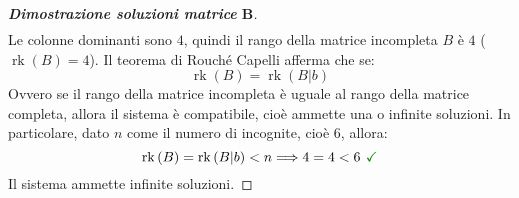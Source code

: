 \documentclass[a4paper]{article}
\DeclareMathOperator{\rk}{rk}
\begin{document}
\begin{proof}[\textbf{Dimostrazione soluzioni matrice} $\boldsymbol{B}$]
\begin{gather*}
		\end{gather*}
		Le colonne dominanti sono $4$, quindi il rango della matrice incompleta $B$ è $4$ ($\rk\left(B\right) = 4$). Il teorema di Rouché Capelli afferma che se:
		\begin{equation*}
			\rk\left(B\right) = \rk\left(B|b\right)
		\end{equation*}
		Ovvero se il rango della matrice incompleta è uguale al rango della matrice completa, allora il sistema è compatibile, cioè ammette una o infinite soluzioni. In particolare, dato $n$ come il numero di incognite, cioè $6$, allora:
		\begin{equation*}
			\rk\left(B\right) = \rk\left(B|b\right) < n \Longrightarrow 4 = 4 < 6 \textcolor{Green4}{\textbf{ \checkmark}}
		\end{equation*}
		Il sistema ammette infinite soluzioni.
	\end{proof}\newpage
	
\end{document}
